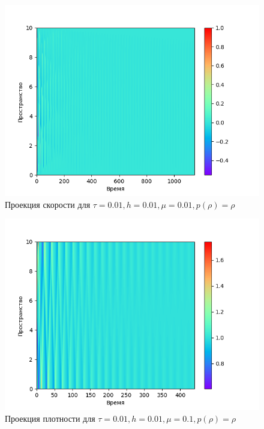 \begin{center}
\begin{figure}[H]
    \centering
    \includegraphics[height=0.4\textheight]{pics/task2/u-2-2-21_2.png}
    \caption{Проекция скорости для $\tau = 0.01, h = 0.01, \mu = 0.01, p(\rho) = \rho$}
\end{figure}

\begin{figure}[H]
    \centering
    \includegraphics[height=0.4\textheight]{pics/task2/h-2-2-11_2.png}
    \caption{Проекция плотности для $\tau = 0.01, h = 0.01, \mu = 0.1, p(\rho) = \rho$}
\end{figure}


\end{center}
